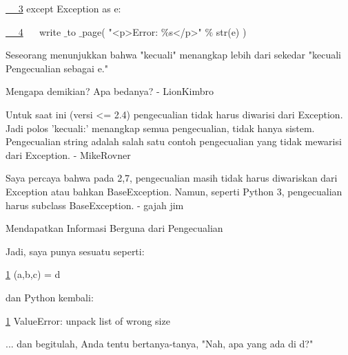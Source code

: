 \documentclass[a4paper,12pt]{report}
\begin{document}
\noindent 
\href{https://wiki.python.org/moin/HandlingExceptions}{~~ 3}
{\fontsize{10pt}{10pt}\selectfont  except Exception as e:} \par
\noindent 
\vspace{10pt}
\noindent 
\href{https://wiki.python.org/moin/HandlingExceptions}{~~ 4}
{\fontsize{10pt}{10pt}\selectfont ~~ write $  \_  $to $  \_  $page( "<p>Error:  $  \%  $s</p>"  $  \%  $ str(e) )} \par
\vspace{16pt}
\noindent 
Seseorang menunjukkan bahwa "kecuali" menangkap lebih dari sekedar "kecuali Pengecualian sebagai e." \par
\noindent 
\vspace{12pt}
\noindent 
Mengapa demikian? Apa bedanya? - LionKimbro \par
\noindent 
\vspace{12pt}
\noindent 
Untuk saat ini (versi <= 2.4) pengecualian tidak harus diwarisi dari Exception. Jadi polos 'kecuali:' menangkap semua pengecualian, tidak hanya sistem. Pengecualian string adalah salah satu contoh pengecualian yang tidak mewarisi dari Exception. - MikeRovner \par
\noindent 
\vspace{12pt}
\noindent 
Saya percaya bahwa pada 2,7, pengecualian masih tidak harus diwariskan dari Exception atau bahkan BaseException. Namun, seperti Python 3, pengecualian harus subclass BaseException. - gajah jim \par
\noindent 
\vspace{12pt}
\noindent 
Mendapatkan Informasi Berguna dari Pengecualian \par
\noindent 
\vspace{12pt}
\noindent 
Jadi, saya punya sesuatu seperti: \par
\noindent 
\vspace{12pt}
\noindent 
\href{https://wiki.python.org/moin/HandlingExceptions}{1}
{\fontsize{10pt}{10pt}\selectfont  (a,b,c) = d} \par
\noindent 
\vspace{12pt}
\noindent 
dan Python kembali: \par
\noindent 
\vspace{12pt}
\noindent 
\href{https://wiki.python.org/moin/HandlingExceptions}{1}
{\fontsize{10pt}{10pt}\selectfont  ValueError: unpack list of wrong size} \par
\vspace{16pt}
\noindent 
... dan begitulah, Anda tentu bertanya-tanya, "Nah, apa yang ada di d?" \par
\end{document}
